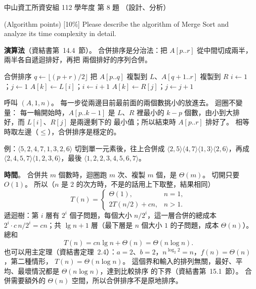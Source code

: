 \begin{pastexam}[label={px:nsysu-112-dmalg-08}]{中山資工所資安組 112 學年度 第 8 題}
（設計、分析）

(Algorithm points) [10\%] Please describe the algorithm of Merge Sort and analyze its time complexity in
detail.
\end{pastexam}

\begin{pastsoln}
\textbf{演算法}（資結書第~14.4~節）。 合併排序是分治法：把 $A[p..r]$ 從中間切成兩半，兩半各自遞迴排好，再把
兩個排好的序列合併。
\begin{pseudo}{合併排序}
        \State $q \gets \lfloor (p + r)/2 \rfloor$
        \State {}
        \State {}
        \State {}
    \EndIf
\EndProcedure
{}
    \State 把 $A[p..q]$ 複製到 $L$、$A[q+1..r]$ 複製到 $R$
    \State $i \gets 1$；$j \gets 1$
            \State $A[k] \gets L[i]$；$i \gets i + 1$
        \Else
            \State $A[k] \gets R[j]$；$j \gets j + 1$
        \EndIf
    \EndFor
\EndProcedure
\end{pseudo}
呼叫 $(A, 1, n)$。  每一步從兩邊目前最前面的兩個數挑小的放進去。 迴圈不變量：
每一輪開始時，$A[p..k-1]$ 是 $L$、$R$ 裡最小的 $k - p$ 個數，由小到大排好，而 $L[i]$、$R[j]$ 是兩邊剩下的
最小值；所以結束時 $A[p..r]$ 排好了。 相等時取左邊（$\le$），合併排序是穩定的。

例：$\langle 5, 2, 4, 7, 1, 3, 2, 6\rangle$ 切到單一元素後，往上合併成 $\langle 2, 5\rangle\langle 4, 7\rangle
\langle 1, 3\rangle\langle 2, 6\rangle$，再成 $\langle 2, 4, 5, 7\rangle\langle 1, 2, 3, 6\rangle$，最後
$\langle 1, 2, 2, 3, 4, 5, 6, 7\rangle$。

\textbf{時間}。  合併共 $m$ 個數時，迴圈跑 $m$ 次、複製 $m$ 個，是 $\Theta(m)$。 切開只要 $O(1)$。
所以（$n$ 是 $2$ 的次方時，不是的話用上下取整，結果相同）
\[
T(n) = \begin{cases} \Theta(1), & n = 1, \\ 2T(n/2) + cn, & n > 1. \end{cases}
\]
遞迴樹：第 $i$ 層有 $2^i$ 個子問題，每個大小 $n/2^i$，這一層合併的總成本 $2^i \cdot c\,n/2^i = cn$；共
$\lg n + 1$ 層（最下層是 $n$ 個大小 $1$ 的子問題，成本 $\Theta(n)$）。 總和
\[
T(n) = cn \lg n + \Theta(n) = \Theta(n \log n).
\]
也可以用主定理（資結書定理~2.4）：$a = 2$、$b = 2$，$n^{\log_2 2} = n$，$f(n) = \Theta(n)$，第二種情形，
$T(n) = \Theta(n \log n)$。 這個界和輸入的排列無關，最好、平均、最壞情況都是 $\Theta(n \log n)$，達到比較排序
的下界（資結書第~15.1~節）。 合併需要額外的 $\Theta(n)$ 空間，所以合併排序不是原地排序。
\end{pastsoln}
